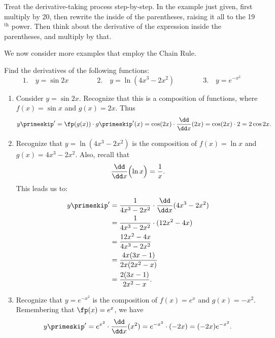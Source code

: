 Treat the derivative-taking process step-by-step. In the example just given, first multiply by 20, then rewrite the inside of the parentheses, raising it all to the 19$^{\text{th}}$ power. Then think about the derivative of the expression inside the parentheses, and multiply by that.


We now consider more examples that employ the Chain Rule.

\begin{example}\label{ex_chain3}
Find the derivatives of the following functions:
\[
 1.\quad y = \sin{2x}\qquad\qquad
 2.\quad y= \ln (4x^3-2x^2)\qquad\qquad
 3.\quad y = e^{-x^2}
\]
\solution
\begin{enumerate}
	\item	Consider $y = \sin 2x$. Recognize that this is a composition of functions, where $f(x) = \sin x$ and $g(x) = 2x$. Thus
	\[
	 y\primeskip' = \fp(g(x))\cdot g\primeskip'(x)
	 =\cos (2x) \cdot \frac{\dd}{\dd x}(2x)= \cos (2x)\cdot 2 = 2\cos 2x.
	\]
	\item	Recognize that $y = \ln (4x^3-2x^2)$ is the composition of $f(x) = \ln x$ and $g(x) = 4x^3-2x^2$. Also, recall that
	\[\frac{\dd}{\dd x}\Bigl(\ln x\Bigr) = \frac{1}{x}.\]
	This leads us to:
	\begin{align*}
	 y\primeskip'
	 & = \frac{1}{4x^3-2x^2} \cdot \frac{\dd}{\dd x} (4x^3-2x^2) \\
	 & = \frac{1}{4x^3-2x^2} \cdot (12x^2-4x) \\
	 & = \frac{12x^2-4x}{4x^3-2x^2} \\
	 & = \frac{4x(3x-1)}{2x(2x^2-x)} \\
	 & = \frac{2(3x-1)}{2x^2-x}.
	\end{align*}
	\item	Recognize  that $y = e^{-x^2}$ is the composition of $f(x) = e^x$ and $g(x) = -x^2$. Remembering that $\fp(x) = e^x$, we have
	\[
	 y\primeskip'=e^{x^2}\cdot\frac{\dd}{\dd x}(x^2)=e^{-x^2}\cdot(-2x)=(-2x)e^{-x^2}.
	\]
\end{enumerate}
\end{example}

